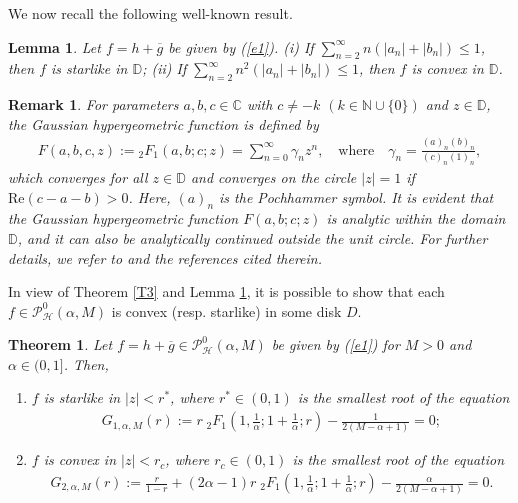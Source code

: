 \documentclass[11pt,reqno]{amsart}
\newtheorem{theo}{Theorem}[section]
\newtheorem{lem}{Lemma}[section]
\newtheorem{rem}{Remark}[section]
\newtheorem{open problem}{Open problem}[section]
\newcommand{\ol}{\overline}
\newcommand{\beas}{\begin{eqnarray*}}
\newcommand{\eeas}{\end{eqnarray*}}
\newcommand{\bea}{\begin{eqnarray}}
\newcommand{\eea}{\end{eqnarray}}
\numberwithin{equation}{section}
\begin{document}
We now recall the following well-known result.
\begin{lem}\label{lem6}\cite{AZ1990} Let $f=h+\ol{g}$ be given by (\ref{e1}). 
(i) If $\sum_{n=2}^{\infty} n\left(|a_n|+|b_n|\right)\leq 1$, then $f$ is starlike in $\mathbb{D}$; 
(ii) If $\sum_{n=2}^{\infty} n^2\left(|a_n|+|b_n|\right)\leq 1$, then $f$ is convex in $\mathbb{D}$.
\end{lem}
\begin{rem}
For parameters $a, b, c\in\mathbb{C}$ with $c\not=-k$ $(k\in\mathbb{N}\cup\{0\})$ and $z\in\mathbb{D}$, the Gaussian hypergeometric function is defined by
\beas F(a, b, c, z):={}_2F_1(a,b;c;z)=\sum_{n=0}^\infty \gamma_n z^n,\quad\text{where}\quad \gamma_n=\frac{(a)_n(b)_n}{(c)_n(1)_n},\eeas
which converges for all $z\in\mathbb{D}$ and converges on the circle $|z|=1$ if $\text{Re}(c-a-b)>0$. Here, $(a)_n$ is the Pochhammer symbol.
It is evident that the Gaussian hypergeometric function $F(a,b;c;z)$ is analytic within the domain $\mathbb{D}$, and it can also be analytically continued outside the unit circle.
For further details, we refer to \cite{QV2005} and the references cited therein.\end{rem}
\noindent In view of \textrm{Theorem \ref{T3}} and \textrm{Lemma \ref{lem6}}, it is possible to show that each $f\in\mathcal{P}_{\mathcal{H}}^0(\alpha,M)$ is convex (resp. starlike) in some disk $D$.
\begin{theo}\label{Theo2} Let $f=h+\ol{g}\in\mathcal{P}_{\mathcal{H}}^0(\alpha,M)$ be given by (\ref{e1}) for $M>0$ and $\alpha\in(0,1]$. Then, \begin{enumerate}
\item[(i)] $f$ is starlike in $|z|<r^*$, where $r^*\in(0,1)$ is the smallest root of the equation 
\bea\label{a1} G_{1,\alpha,M}(r):=r\;{}_2F_1\left(1,\frac{1}{\alpha};1+\frac{1}{\alpha}; r\right)-\frac{1}{2(M-\alpha+1)}=0;\eea
\item[(ii)] $f$ is convex in $|z|<r_c$, where $r_c\in(0,1)$ is the smallest root of the equation 
\beas G_{2,\alpha,M}(r):=\frac{r}{1-r}+\left(2\alpha-1\right)r\;{}_2F_1\left(1,\frac{1}{\alpha};1+\frac{1}{\alpha}; r\right)-\frac{\alpha}{2(M-\alpha+1)}=0.\eeas
\end{enumerate}\end{theo}
\end{document}

